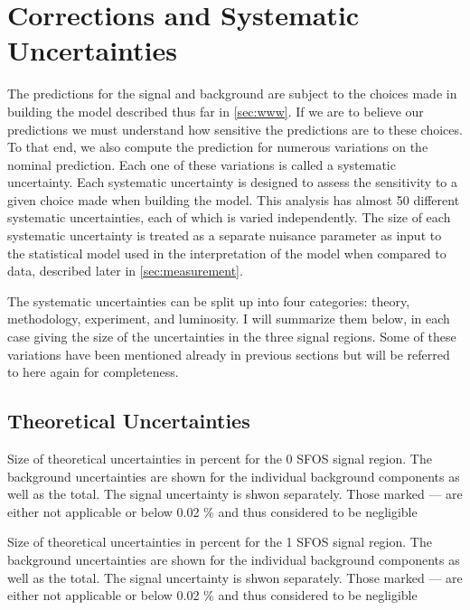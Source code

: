 \section{Corrections and Systematic Uncertainties}
\label{sec:systematics}

The predictions for the signal and background are subject
to the choices made in building the model described thus
far in \sec\ref{sec:www}. If we are to believe our predictions
we must understand how sensitive the predictions are to these choices.
To that end, we also compute the prediction for numerous variations
on the nominal prediction. 
Each one of these variations is called a systematic uncertainty. 
Each systematic uncertainty is designed to assess the sensitivity
to a given choice made when building the model. 
This analysis has almost 50 different systematic
uncertainties, each of which is varied independently. The size of 
each systematic uncertainty
is treated as a separate nuisance parameter
as input to the statistical model used in the interpretation of the model
when compared to data, described later in \sec\ref{sec:measurement}.

The systematic uncertainties can be split up into four categories:
theory, methodology, experiment, and luminosity. 
I will summarize them below, in each case giving the 
size of the uncertainties in the three signal regions. 
Some of these variations have 
been mentioned already in previous sections but will be
referred to here again for completeness.

\subsection{Theoretical Uncertainties}




\begin{table}[ht]
\centering

\caption{Size of theoretical uncertainties in percent for the 0 SFOS signal region. The background uncertainties are shown for the individual background components as well as the total. The signal uncertainty is shwon separately. Those marked --- are either not applicable or below 0.02 \% and thus considered to be negligible}
\label{tab:sys_theory_0sfos}
\end{table}

\begin{table}[ht]
\centering

\caption{Size of theoretical uncertainties in percent for the 1 SFOS signal region. The background uncertainties are shown for the individual background components as well as the total. The signal uncertainty is shwon separately. Those marked --- are either not applicable or below 0.02 \% and thus considered to be negligible}
\label{tab:sys_theory_1sfos}
\end{table}

